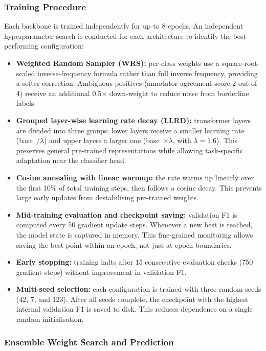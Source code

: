\documentclass[11pt]{article}
\begin{document}
\subsubsection*{Training Procedure}

Each backbone is trained independently for up to 8 epochs. An independent hyperparameter search is conducted for each architecture to identify the best-performing configuration:

\begin{itemize}[noitemsep]
    \item \textbf{Weighted Random Sampler (WRS):} per-class weights use a square-root-scaled inverse-frequency formula rather than full inverse frequency, providing a softer correction. Ambiguous positives (annotator agreement score 2 out of 4) receive an additional 0.5$\times$ down-weight to reduce noise from borderline labels.
    \item \textbf{Grouped layer-wise learning rate decay (LLRD):} transformer layers are divided into three groups; lower layers receive a smaller learning rate (base~$/ \lambda$) and upper layers a larger one (base~$\times \lambda$, with $\lambda = 1.6$). This preserves general pre-trained representations while allowing task-specific adaptation near the classifier head.
    \item \textbf{Cosine annealing with linear warmup:} the rate warms up linearly over the first 10\% of total training steps, then follows a cosine decay. This prevents large early updates from destabilising pre-trained weights.
    \item \textbf{Mid-training evaluation and checkpoint saving:} validation F1 is computed every 50 gradient update steps. Whenever a new best is reached, the model state is captured in memory. This fine-grained monitoring allows saving the best point within an epoch, not just at epoch boundaries.
    \item \textbf{Early stopping:} training halts after 15 consecutive evaluation checks (750 gradient steps) without improvement in validation F1.
    \item \textbf{Multi-seed selection:} each configuration is trained with three random seeds (42, 7, and 123). After all seeds complete, the checkpoint with the highest internal validation F1 is saved to disk. This reduces dependence on a single random initialisation.
\end{itemize}

\subsubsection*{Ensemble Weight Search and Prediction}
\end{document}
